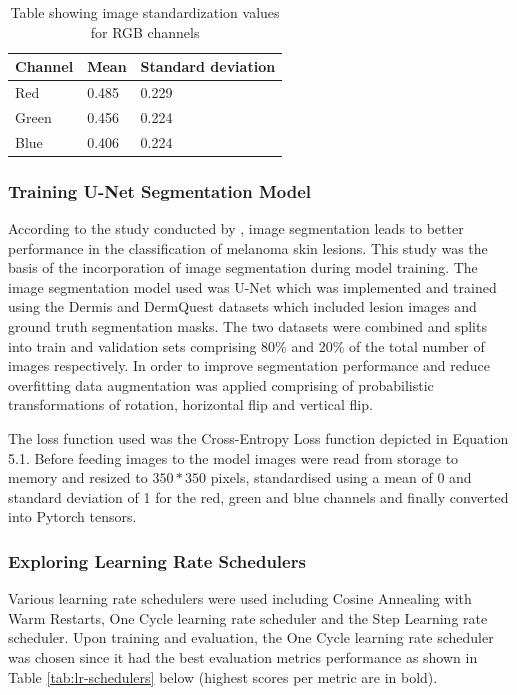 \documentclass[12pt, a4paper]{article}
\begin{document}
\begin{table}[h]
    \centering
    \begin{tabular}{|l|l|l|}
        \hline
        \textbf{Channel} & \textbf{Mean} & \textbf{Standard deviation} \\\hline
        Red              & 0.485         & 0.229                       \\\hline
        Green            & 0.456         & 0.224                       \\\hline
        Blue             & 0.406         & 0.224                       \\\hline
    \end{tabular}
    \caption{Table showing image standardization values for RGB channels}
    \label{tab:mean-std-values}
\end{table}

\subsubsection{Training U-Net Segmentation Model}
According to the study conducted by \cite{codella2017deep}, image segmentation leads to better performance in the classification of melanoma skin lesions. This study was the basis of the incorporation of image segmentation during model training. The image segmentation model used was U-Net which was implemented and trained using the Dermis and DermQuest datasets which included lesion images and ground truth segmentation masks. The two datasets were combined and splits into train and validation sets comprising 80\% and 20\% of the total number of images respectively. In order to improve segmentation performance and reduce overfitting data augmentation was applied comprising of probabilistic transformations of rotation, horizontal flip and vertical flip.

The loss function used was the Cross-Entropy Loss function depicted in Equation 5.1. Before feeding images to the model images were read from storage to memory and resized to $350 * 350$ pixels, standardised using a mean of 0 and standard deviation of 1 for the red, green and blue channels and finally converted into Pytorch tensors.

\subsubsection{Exploring Learning Rate Schedulers}
Various learning rate schedulers were used including Cosine Annealing with Warm Restarts, One Cycle learning rate scheduler and the Step Learning rate scheduler. Upon training and evaluation, the One Cycle learning rate scheduler was chosen since it had the best evaluation metrics performance as shown in Table \ref{tab:lr-schedulers} below (highest scores per metric are in bold).
\end{document}
